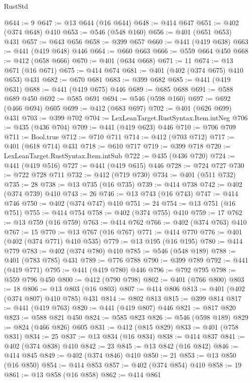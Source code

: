 \begin{lexlean}{RustStd}
\begin{coremodule}
{\begin{coremodule}
{{{{{@644 := 9
@647 := @13 @644 (@16 @644)
@648 := @414 @647
@651 := @402 (@374 @648) @410
@653 := @546 (@548 @160)
@656 := @401 (@651 @653) @431
@657 := @643 @656
@658 := @399 @657
@660 := @441 (@419 @638)
@663 := @441 (@419 @648) @446
@664 := @660 @663
@666 := @559 @664 @450
@668 := @412 (@658 @666)
@670 := @401 (@634 @668)
@671 := 11
@674 := @13 @671 (@16 @671)
@675 := @414 @674
@681 := @401 (@402 (@374 @675) @410 @653) @431
@682 := @670 @681
@683 := @399 @682
@685 := @441 (@419 @631)
@688 := @441 (@419 @675) @446
@689 := @685 @688
@691 := @588 @689 @450
@692 := @585 @691
@694 := @546 (@598 @160)
@697 := @692 (@466 @694) @605
@699 := @412 (@683 @697)
@702 := @401 (@626 @699) @431
@703 := @399 @702
@704 := LexLeanTarget.RustSyntax.Item.intNeg
@706 := @435 (@436 @704)
@709 := @441 (@419 @623) @446
@710 := @706 @709
@711 := Bool.true
@712 := @710 @711
@714 := @412 (@703 @712)
@717 := @401 (@618 @714) @431
@718 := @610 @717
@719 := @399 @718
@720 := LexLeanTarget.RustSyntax.Item.intSub
@722 := @435 (@436 @720)
@724 := @441 (@419 @516)
@727 := @441 (@419 @615) @446
@728 := @724 @727
@730 := @722 @728 @711
@732 := @412 (@719 @730)
@734 := @401 (@511 @732)
@735 := 28
@738 := @13 @735 (@16 @735)
@739 := @414 @738
@742 := @402 (@374 @739) @410
@743 := 26
@746 := @13 @743 (@16 @743)
@747 := @414 @746
@750 := @402 (@374 @747) @410
@751 := 24
@754 := @13 @751 (@16 @751)
@755 := @414 @754
@758 := @402 (@374 @755) @410
@759 := 17
@762 := @13 @759 (@16 @759)
@763 := @414 @762
@766 := @402 (@374 @763) @410
@767 := 15
@770 := @13 @767 (@16 @767)
@771 := @414 @770
@776 := @401 (@402 (@374 @771) @410 @535)
@779 := @13 @195 (@16 @195)
@780 := @414 @779
@783 := @402 (@374 @780) @410
@785 := @546 (@548 @189)
@788 := @401 (@783 @785) @431
@789 := @776 @788
@790 := @399 @789
@792 := @441 (@419 @771)
@795 := @441 (@419 @780) @446
@796 := @792 @795
@798 := @559 @796 @450
@800 := @412 (@790 @798)
@802 := @401 (@766 @800)
@803 := 18
@806 := @13 @803 (@16 @803)
@807 := @414 @806
@813 := @401 (@402 (@374 @807) @410 @785) @431
@814 := @802 @813
@815 := @399 @814
@817 := @441 (@419 @763)
@820 := @441 (@419 @807) @446
@821 := @817 @820
@823 := @588 @821 @450
@824 := @585 @823
@826 := @546 (@598 @189)
@829 := @824 (@466 @826) @605
@831 := @412 (@815 @829)
@833 := @401 (@758 @831)
@834 := 25
@837 := @13 @834 (@16 @834)
@838 := @414 @837
@841 := @402 (@374 @838) @410
@842 := 23
@845 := @13 @842 (@16 @842)
@846 := @414 @845
@849 := @402 (@374 @846) @410
@850 := 21
@853 := @13 @850 (@16 @850)
@854 := @414 @853
@857 := @402 (@374 @854) @410
@858 := 19
@861 := @13 @858 (@16 @858)
@862 := @414 @861
}}}}}
\end{coremodule}}
\end{coremodule}
\end{lexlean}
